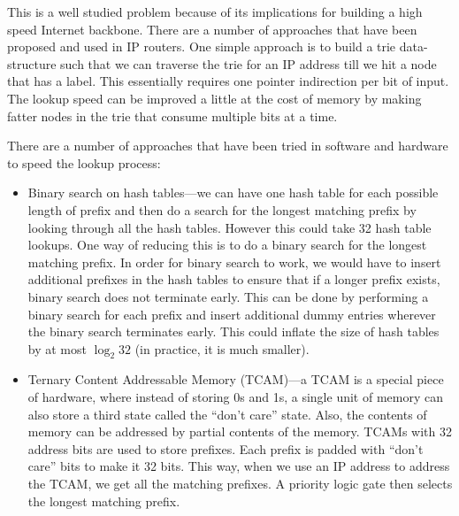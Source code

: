 This is a well studied problem because of its implications for
building a high speed Internet backbone. There are a number of 
approaches that have been proposed and used in IP routers. 
One simple approach is to build a trie data-structure such
that we can traverse the trie for an IP address till we hit a node that has a
label. This essentially requires one pointer indirection per bit of input. The lookup speed
can be improved a little at the cost of memory by making fatter nodes
in the trie that consume multiple bits at a time.

There are a number of approaches that have been tried in software and
hardware to speed the lookup process:
\begin{itemize}
\itemsep 1pt

\item Binary search on hash tables---we can have one hash table
  for each possible length of prefix and then do a search for the
  longest matching prefix by looking through all the hash tables. However this could take 32 hash table lookups. One way of
  reducing this is to do a binary search for the longest matching
  prefix. In order for binary search to work, we would have to insert
  additional prefixes in the hash tables to ensure that if a longer prefix exists,
  binary search does not terminate early. This can be done by performing a binary search for each prefix and insert additional dummy entries wherever the binary search terminates early. This could inflate the size
  of hash tables by at most $\log_2 32$ (in practice, it is much
  smaller).

\item Ternary Content Addressable Memory (TCAM)---a TCAM is a special
  piece of hardware, where instead of storing 0s and 1s, a single unit
  of memory can also store a third state called the ``don't care''
  state. Also, the contents of memory can be addressed by partial
  contents of the memory. TCAMs with 32 address bits are used to store
  prefixes. Each prefix is padded with ``don't care'' bits to make it 32
  bits. This way, when we use an IP address to address the TCAM, we
  get all the matching prefixes. A priority logic gate then selects the
  longest matching prefix.
\end{itemize}


